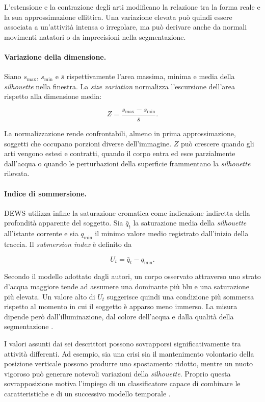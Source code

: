 L'estensione e la contrazione degli arti modificano la relazione tra la forma reale e la sua approssimazione ellittica. Una variazione elevata può quindi essere associata a un'attività intensa o irregolare, ma può derivare anche da normali movimenti natatori o da imprecisioni nella segmentazione.

\paragraph{Variazione della dimensione.}
Siano $s_{\max}$, $s_{\min}$ e $\bar{s}$ rispettivamente l'area massima, minima e media della \textit{silhouette} nella finestra. La \textit{size variation} normalizza l'escursione dell'area rispetto alla dimensione media:

\begin{equation}
    Z
    =
    \frac{s_{\max}-s_{\min}}{\bar{s}}.
\end{equation}

La normalizzazione rende confrontabili, almeno in prima approssimazione, soggetti che occupano porzioni diverse dell'immagine. $Z$ può crescere quando gli arti vengono estesi e contratti, quando il corpo entra ed esce parzialmente dall'acqua o quando le perturbazioni della superficie frammentano la \textit{silhouette} rilevata.

\paragraph{Indice di sommersione.}
DEWS utilizza infine la saturazione cromatica come indicazione indiretta della profondità apparente del soggetto. Sia $\bar{q}_t$ la saturazione media della \textit{silhouette} all'istante corrente e sia $q_{\min}$ il minimo valore medio registrato dall'inizio della traccia. Il \textit{submersion index} è definito da

\begin{equation}
    U_t
    =
    \bar{q}_t-q_{\min}.
\end{equation}

Secondo il modello adottato dagli autori, un corpo osservato attraverso uno strato d'acqua maggiore tende ad assumere una dominante più blu e una saturazione più elevata. Un valore alto di $U_t$ suggerisce quindi una condizione più sommersa rispetto al momento in cui il soggetto è apparso meno immerso. La misura dipende però dall'illuminazione, dal colore dell'acqua e dalla qualità della segmentazione \cite{Eng2008DEWS}.

I valori assunti dai sei descrittori possono sovrapporsi significativamente tra attività differenti. Ad esempio, sia una crisi sia il mantenimento volontario della posizione verticale possono produrre uno spostamento ridotto, mentre un nuoto vigoroso può generare notevoli variazioni della \textit{silhouette}. Proprio questa sovrapposizione motiva l'impiego di un classificatore capace di combinare le caratteristiche e di un successivo modello temporale \cite{Eng2008DEWS}.

